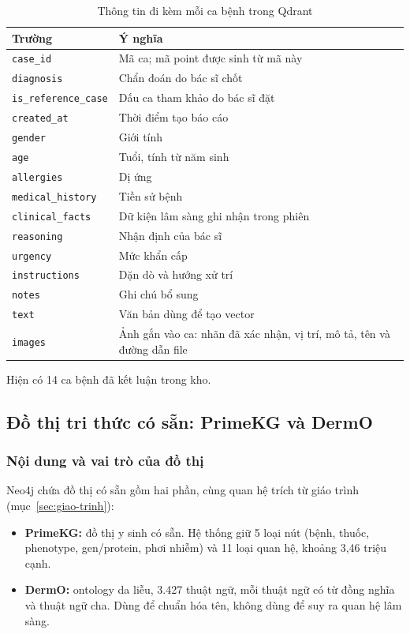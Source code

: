\begin{table}[H]
\centering
\caption{Thông tin đi kèm mỗi ca bệnh trong Qdrant}
\label{tab:cb-payload}
\small
\begin{tabular}{|p{4.0cm}|p{9.5cm}|}
\hline
\textbf{Trường} & \textbf{Ý nghĩa} \\ \hline
\texttt{case\_id} & Mã ca; mã point được sinh từ mã này \\ \hline
\texttt{diagnosis} & Chẩn đoán do bác sĩ chốt \\ \hline
\texttt{is\_reference\_case} & Dấu ca tham khảo do bác sĩ đặt \\ \hline
\texttt{created\_at} & Thời điểm tạo báo cáo \\ \hline
\texttt{gender} & Giới tính \\ \hline
\texttt{age} & Tuổi, tính từ năm sinh \\ \hline
\texttt{allergies} & Dị ứng \\ \hline
\texttt{medical\_history} & Tiền sử bệnh \\ \hline
\texttt{clinical\_facts} & Dữ kiện lâm sàng ghi nhận trong phiên \\ \hline
\texttt{reasoning} & Nhận định của bác sĩ \\ \hline
\texttt{urgency} & Mức khẩn cấp \\ \hline
\texttt{instructions} & Dặn dò và hướng xử trí \\ \hline
\texttt{notes} & Ghi chú bổ sung \\ \hline
\texttt{text} & Văn bản dùng để tạo vector \\ \hline
\texttt{images} & Ảnh gắn vào ca: nhãn đã xác nhận, vị trí, mô tả, tên và đường dẫn file \\ \hline
\end{tabular}
\end{table}

Hiện có 14 ca bệnh đã kết luận trong kho.

\subsection{Đồ thị tri thức có sẵn: PrimeKG và DermO}
\label{sec:do-thi-tri-thuc}

\subsubsection{Nội dung và vai trò của đồ thị}

Neo4j chứa đồ thị có sẵn gồm hai phần, cùng quan hệ trích từ giáo trình (mục~\ref{sec:giao-trinh}):
\begin{itemize}
  \item \textbf{PrimeKG:} đồ thị y sinh có sẵn. Hệ thống giữ 5 loại nút (bệnh, thuốc, phenotype, gen/protein, phơi nhiễm) và 11 loại quan hệ, khoảng 3,46 triệu cạnh.
  \item \textbf{DermO:} ontology da liễu, 3.427 thuật ngữ, mỗi thuật ngữ có từ đồng nghĩa và thuật ngữ cha. Dùng để chuẩn hóa tên, không dùng để suy ra quan hệ lâm sàng.
\end{itemize}

